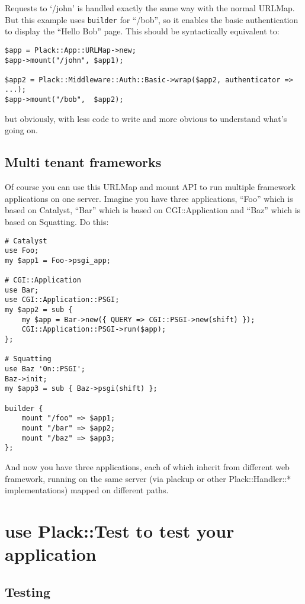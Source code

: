 Requests to `/john' is handled exactly the same way with the normal
URLMap. But this example uses \lstinline!builder! for ``/bob'', so it
enables the basic authentication to display the ``Hello Bob'' page. This
should be syntactically equivalent to:

\begin{lstlisting}
$app = Plack::App::URLMap->new;
$app->mount("/john", $app1);

$app2 = Plack::Middleware::Auth::Basic->wrap($app2, authenticator => ...);
$app->mount("/bob",  $app2);
\end{lstlisting}

but obviously, with less code to write and more obvious to understand
what's going on.

\section{Multi tenant frameworks}\label{multi-tenant-frameworks}

Of course you can use this URLMap and mount API to run multiple
framework applications on one server. Imagine you have three
applications, ``Foo'' which is based on Catalyst, ``Bar'' which is based
on CGI::Application and ``Baz'' which is based on Squatting. Do this:

\begin{lstlisting}
# Catalyst
use Foo;
my $app1 = Foo->psgi_app;

# CGI::Application
use Bar;
use CGI::Application::PSGI;
my $app2 = sub { 
    my $app = Bar->new({ QUERY => CGI::PSGI->new(shift) });
    CGI::Application::PSGI->run($app);
};

# Squatting
use Baz 'On::PSGI';
Baz->init;
my $app3 = sub { Baz->psgi(shift) };

builder {
    mount "/foo" => $app1;
    mount "/bar" => $app2;
    mount "/baz" => $app3;
};
\end{lstlisting}

And now you have three applications, each of which inherit from
different web framework, running on the same server (via plackup or
other Plack::Handler::* implementations) mapped on different paths.

\chapter{use Plack::Test to test your
application}\label{day-13-use-placktest-to-test-your-application}

\section{Testing}\label{testing}

